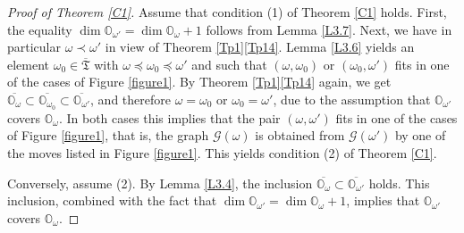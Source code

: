 \documentclass[11pt]{article}
\theoremstyle{definition}
\numberwithin{equation}{section}
\newcommand{\Xorbit}{\mathbb{O}}
\newcommand{\ppermutationsof}{\mathfrak{T}}
\newcommand{\parameters}{\overline{\ppermutationsof}}
\begin{document}
\begin{proof}[Proof of Theorem \ref{C1}]
Assume that condition (1) of Theorem \ref{C1} holds.
First, the equality
$\dim\Xorbit_{\omega'}=\dim\Xorbit_\omega+1$
follows from Lemma \ref{L3.7}.
Next, we have in particular $\omega\prec\omega'$ in view of Theorem \ref{Tp1}\ref{Tp14}. Lemma \ref{L3.6} yields an element $\omega_0\in\parameters$ with $\omega\preceq\omega_0\preceq\omega'$ and such that $(\omega,\omega_0)$ or $(\omega_0,\omega')$ fits in one of the cases of Figure \ref{figure1}. By Theorem \ref{Tp1}\ref{Tp14} again, we get $\overline{\Xorbit_\omega}\subset\overline{\Xorbit_{\omega_0}}\subset\overline{\Xorbit_{\omega'}}$, and therefore $\omega=\omega_0$ or $\omega_0=\omega'$, due to the assumption that $\Xorbit_{\omega'}$ covers $\Xorbit_\omega$. In both cases this implies that the pair $(\omega,\omega')$ fits in one of the cases of Figure \ref{figure1}, that is, the graph $\mathcal{G}(\omega)$ is obtained from $\mathcal{G}(\omega')$ by one of the moves listed in Figure \ref{figure1}. This yields condition (2) of Theorem \ref{C1}.

Conversely, assume (2). By Lemma \ref{L3.4}, the inclusion $\overline{\Xorbit_\omega}\subset\overline{\Xorbit_{\omega'}}$ holds. This inclusion, combined with the fact that $\dim\Xorbit_{\omega'}=\dim\Xorbit_\omega+1$, implies that $\Xorbit_{\omega'}$ covers $\Xorbit_\omega$.
\end{proof}
\end{document}
